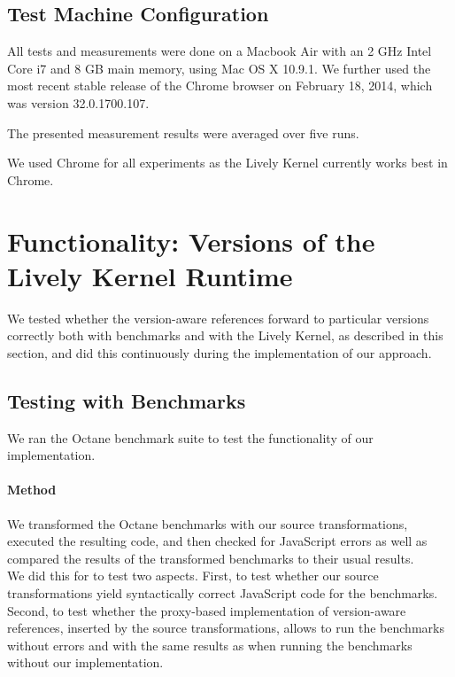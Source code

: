 \subsection{Test Machine Configuration}

All tests and measurements were done on a Macbook Air with an 2 GHz Intel Core i7 and 8 GB main memory, using Mac OS X 10.9.1.
We further used the most recent stable release of the Chrome browser on February 18, 2014, which was version 32.0.1700.107.

The presented measurement results were averaged over five runs.

We used Chrome for all experiments as the Lively Kernel currently works best in Chrome.







\section{Functionality: Versions of the Lively Kernel Runtime} \label{sec:DISCUSSION:1}

We tested whether the version-aware references forward to particular versions correctly both with benchmarks and with the Lively Kernel, as described in this section, and did this continuously during the implementation of our approach.

\subsection{Testing with Benchmarks}

We ran the Octane benchmark suite to test the functionality of our implementation.

\paragraph{Method}
We transformed the Octane benchmarks with our source transformations, executed the resulting code, and then checked for JavaScript errors as well as compared the results of the transformed benchmarks to their usual results.\\
We did this for to test two aspects.
First, to test whether our source transformations yield syntactically correct JavaScript code for the benchmarks.
Second, to test whether the proxy-based implementation of version-aware references, inserted by the source transformations, allows to run the benchmarks without errors and with the same results as when running the benchmarks without our implementation.


